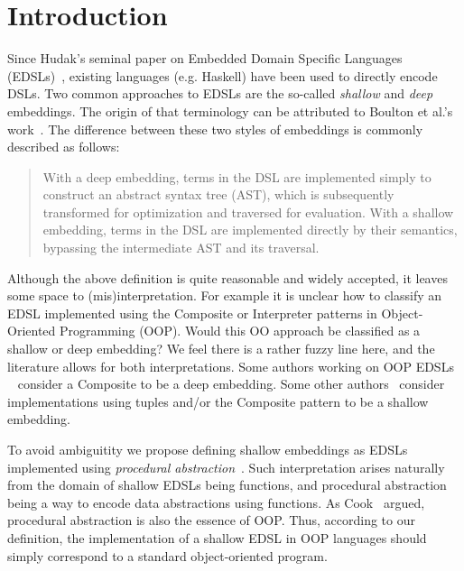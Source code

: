 \section{Introduction}

Since Hudak's seminal paper on Embedded Domain Specific Languages (EDSLs)~\cite{hudak1998modular}, existing
languages (e.g. Haskell) have been used to directly encode
DSLs. Two common approaches to EDSLs are the so-called \emph{shallow}
and \emph{deep} embeddings. The origin of that terminology can be
attributed to Boulton et al.'s work~\cite{Boulton92dsl}. The difference between these
two styles of embeddings is commonly described as follows:

\begin{quote}
With a deep embedding, terms in the DSL are implemented simply to
construct an abstract syntax tree (AST), which is subsequently
transformed for optimization and traversed for evaluation. With a
shallow embedding, terms in the DSL are implemented directly by
their semantics, bypassing the intermediate AST and its traversal.\cite{gibbons2014folding}
\end{quote}


\noindent Although the above definition is quite reasonable and widely accepted,
it leaves some space to (mis)interpretation. For example it is unclear 
how to classify an EDSL implemented using the {\sc Composite} or {\sc Interpreter} 
patterns in Object-Oriented Programming (OOP). Would this OO approach be
classified as a shallow or deep embedding? We feel there is a rather
fuzzy line here, and the literature allows for both interpretations. Some authors working on
OOP EDSLs ~\cite{rompf2012scala,scherrc2015} consider a {\sc Composite} to be a deep
embedding. Some other authors~\cite{gibbons2014folding,barringer2011tracecontract}
consider implementations using tuples and/or the  {\sc Composite}
pattern to be a shallow embedding.  


To avoid ambiguitity we propose defining shallow embeddings as EDSLs implemented using \emph{procedural abstraction}~\cite{reynolds94proceduralabstraction}. Such
interpretation arises naturally from the domain of shallow EDSLs being
functions, and procedural abstraction being a way to encode
data abstractions using functions. As Cook~\cite{cook09abstraction} argued,
procedural abstraction is also the essence of OOP.
Thus, according to our definition, the implementation of a shallow
EDSL in OOP languages should simply correspond to a standard
object-oriented program. 


